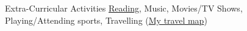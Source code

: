 \documentclass{resume}
\begin{document}








\begin{rSection}{Extra-Curricular Activities}
  \href{https://www.goodreads.com/review/list/30403080}{Reading}, Music, Movies/TV Shows, Playing/Attending sports, Travelling (\href{https://www.google.com/maps/d/edit?mid=zunfqCxpiwTU.kOUFmlYs1s4o&usp=sharing}{My travel map}) \\
\end{rSection}



\end{document}
